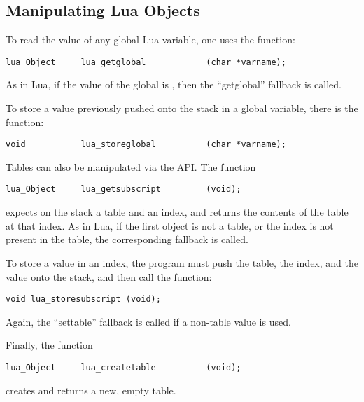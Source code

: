 \subsection{Manipulating Lua Objects}
To read the value of any global Lua variable,
one uses the function:
\begin{verbatim}
lua_Object     lua_getglobal            (char *varname);
\end{verbatim}
As in Lua, if the value of the global is \nil,
then the ``getglobal'' fallback is called.

To store a value previously pushed onto the stack in a global variable,
there is the function:
\begin{verbatim}
void           lua_storeglobal          (char *varname);
\end{verbatim}

Tables can also be manipulated via the API.
The function
\begin{verbatim}
lua_Object     lua_getsubscript         (void);
\end{verbatim}
expects on the stack a table and an index,
and returns the contents of the table at that index.
As in Lua, if the first object is not a table,
or the index is not present in the table,
the corresponding fallback is called.

To store a value in an index,
the program must push the table, the index, and the value onto the stack,
and then call the function:
\begin{verbatim}
void lua_storesubscript (void);
\end{verbatim}
Again, the ``settable'' fallback is called if a non-table value is used.

Finally, the function
\begin{verbatim}
lua_Object     lua_createtable          (void);
\end{verbatim}
creates and returns a new, empty table.

